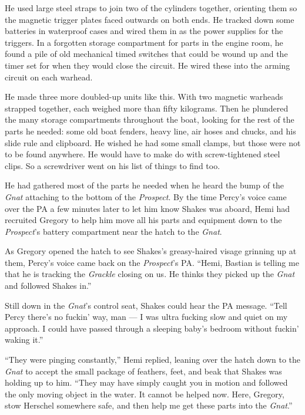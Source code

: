 \documentclass[
]{scrbook}
\begin{document}
He used large steel straps to join two of the cylinders together,
orienting them so the magnetic trigger plates faced outwards on both
ends. He tracked down some batteries in waterproof cases and wired them
in as the power supplies for the triggers. In a forgotten storage
compartment for parts in the engine room, he found a pile of old
mechanical timed switches that could be wound up and the timer set for
when they would close the circuit. He wired these into the arming
circuit on each warhead.

He made three more doubled-up units like this. With two magnetic
warheads strapped together, each weighed more than fifty kilograms. Then
he plundered the many storage compartments throughout the boat, looking
for the rest of the parts he needed: some old boat fenders, heavy line,
air hoses and chucks, and his slide rule and clipboard. He wished he had
some small clamps, but those were not to be found anywhere. He would
have to make do with screw-tightened steel clips. So a screwdriver went
on his list of things to find too.

He had gathered most of the parts he needed when he heard the bump of
the \emph{Gnat} attaching to the bottom of the \emph{Prospect}. By the
time Percy's voice came over the PA a few minutes later to let him know
Shakes was aboard, Hemi had recruited Gregory to help him move all his
parts and equipment down to the \emph{Prospect}'s battery compartment
near the hatch to the \emph{Gnat}.

As Gregory opened the hatch to see Shakes's greasy-haired visage
grinning up at them, Percy's voice came back on the \emph{Prospect}'s
PA. ``Hemi, Bastian is telling me that he is tracking the \emph{Grackle}
closing on us. He thinks they picked up the \emph{Gnat} and followed
Shakes in.''

Still down in the \emph{Gnat}'s control seat, Shakes could hear the PA
message. ``Tell Percy there's no fuckin' way, man --- I was ultra
fucking slow and quiet on my approach. I could have passed through a
sleeping baby's bedroom without fuckin' waking it.''

``They were pinging constantly,'' Hemi replied, leaning over the hatch
down to the \emph{Gnat} to accept the small package of feathers, feet,
and beak that Shakes was holding up to him. ``They may have simply
caught you in motion and followed the only moving object in the water.
It cannot be helped now. Here, Gregory, stow Herschel somewhere safe,
and then help me get these parts into the \emph{Gnat}.''
\end{document}
